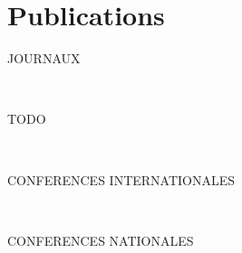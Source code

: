 \chapter*{Publications}


\begin{refsection}[ownpubs]

    \noindent JOURNAUX
    \small
    
    \

    TODO

    \printbibliography[keyword=journal, heading=none]

    \

    \noindent CONFERENCES INTERNATIONALES
    \small
    \nocite{soule2024moise_marl}
    \nocite{soule2024marl}
    \nocite{soulej2023sim}
    \printbibliography[keyword=international, heading=none]

    \

    \noindent CONFERENCES NATIONALES
    \nocite{soule2023jfsmathese}
    \nocite{soule2023ressithese}
    \nocite{soule2023rjciathese}
    \nocite{soule2024outil}
    \nocite{soule2024approche}
    \printbibliography[keyword=national, heading=none]

\end{refsection}
